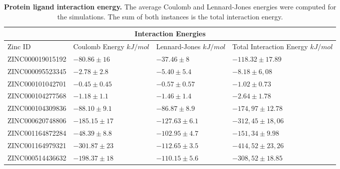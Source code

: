 \documentclass[11pt, letterpaper, titlepage]{article}
\begin{document}
\begin{table}[h!]

\centering 
\caption{\textbf{Protein ligand interaction energy.} The average Coulomb and Lennard-Jones energies were computed for the simulations. The sum of both instances is the total interaction energy.}

\begin{tabular}{ |p{3.3cm}||p{3cm}||p{3cm}|| p{3cm}|} 

\hline 

\multicolumn{4}{|c|}{Interaction Energies } \\ 

\hline 

Zinc ID & Coulomb Energy $kJ/mol$& Lennard-Jones $kJ/mol$& Total Interaction Energy  $kJ/mol$ \\ 

\hline 

ZINC000019015192 & $-80.86 \pm 16$ & $-37.46 \pm 8$ & $ -118.32 \pm 17.89 $\\ 

ZINC000095523345 & $ -2.78 \pm 2.8$ & $-5.40 \pm 5.4$ & $-8.18 \pm 6,08$ \\ 

ZINC000101042701 & $ -0.45 \pm 0.45 $ & $ -0.57 \pm 0.57 $ & $-1.02\pm 0.73 $\\ 

ZINC000104277568 & $ -1.18 \pm 1.1 $ & $ -1.46 \pm 1.4 $ & $-2.64 \pm 1.78$ \\ 

ZINC000104309836 & $ -88.10 \pm 9.1 $ & $ -86.87 \pm 8.9 $ & $-174,97 \pm 12.78$ \\ 

ZINC000620748806 & $ -185.15 \pm 17 $ & $ -127.63 \pm 6.1 $ & $-312,45 \pm 18,06$ \\ 

ZINC001164872284 & $ -48.39 \pm 8.8 $ & $ -102.95\pm 4.7 $ & $-151,34 \pm 9.98$ \\ 

ZINC001164979321 & $ -301.87 \pm 23 $ & $ -112.65\pm 3.5 $ & $-414,52 \pm 23,26$ \\ 

ZINC000514436632 & $ -198.37 \pm 18 $ & $ -110.15\pm 5.6 $ & $-308,52 \pm 18.85$ \\ 

\hline 

\end{tabular} 

\label{table:protein_ligand_interaction_energy} 

\end{table} 
\end{document}
